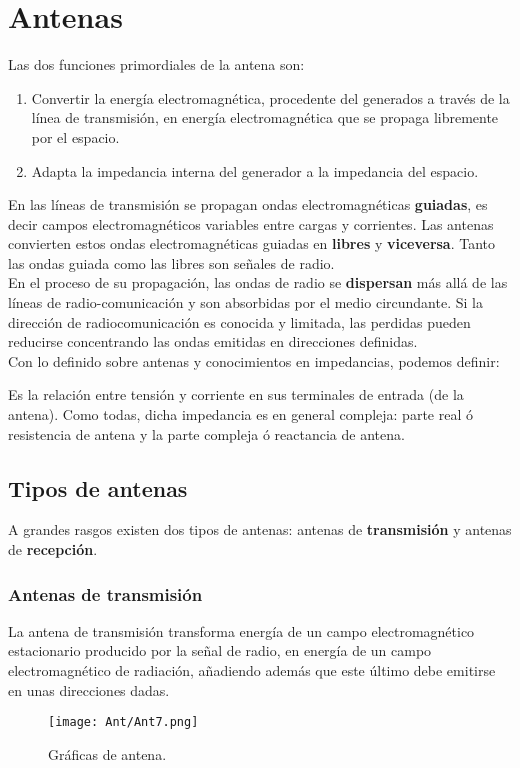 \documentclass[
	12pt, %
	fleqn, %
	a4paper, %
	oneside, %
]{LegrandOrangeBook}
\begin{document}
\section{Antenas}
Las dos funciones primordiales de la antena son:
\begin{enumerate}
\item Convertir la energía electromagnética, procedente del generados a través de la línea de transmisión, en energía electromagnética que se propaga libremente por el espacio.
\item Adapta la impedancia interna del generador a la impedancia del espacio.
\end{enumerate}
En las líneas de transmisión se propagan ondas electromagnéticas \textbf{guiadas}, es decir campos electromagnéticos variables entre cargas y corrientes. Las antenas convierten estos ondas electromagnéticas guiadas en \textbf{libres} y \textbf{viceversa}. Tanto las ondas guiada como las libres son señales de radio.\\
En el proceso de su propagación, las ondas de radio se \textbf{dispersan} más allá de las líneas de radio-comunicación y son absorbidas por el medio circundante. Si la dirección de radiocomunicación es conocida y limitada, las perdidas pueden reducirse concentrando las ondas emitidas en direcciones definidas.\\
Con lo definido sobre antenas y conocimientos en impedancias, podemos definir:
\begin{corollary}
Es la relación entre tensión y corriente en sus terminales de entrada (de la antena). Como todas, dicha impedancia es en general compleja: parte real ó resistencia de antena y la parte compleja ó reactancia de antena.
\end{corollary}
\subsection{Tipos de antenas}
A grandes rasgos existen dos tipos de antenas: antenas de \textbf{transmisión} y antenas de \textbf{recepción}.
\subsubsection*{Antenas de transmisión}
La antena de transmisión transforma energía de un campo electromagnético estacionario producido por la señal de radio, en energía de un campo electromagnético de radiación, añadiendo además que este último debe emitirse en unas direcciones dadas.
\begin{figure}[]
\centering
\texttt{[image: Ant/Ant7.png]}
\caption{Gráficas de antena.}
\end{figure}
\end{document}
